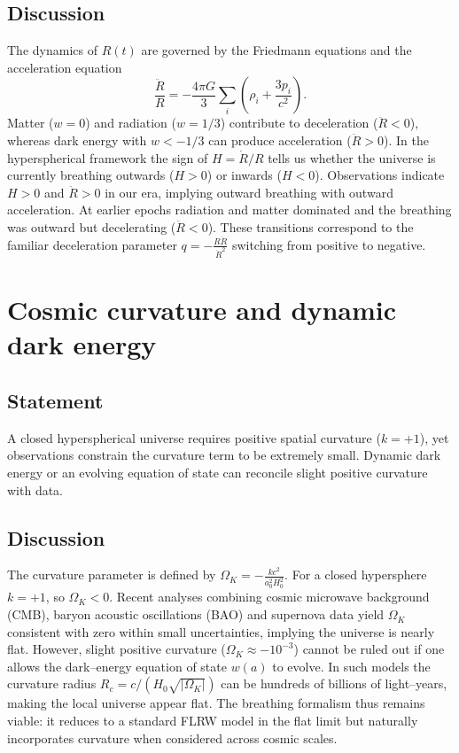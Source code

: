 \documentclass[12pt,a4paper]{article}
\begin{document}
\subsection{Discussion}
The dynamics of $R(t)$ are governed by the Friedmann equations and the acceleration equation
\[
\frac{\ddot{R}}{R} = -\frac{4\pi G}{3}\sum_i \left( \rho_i + \frac{3p_i}{c^2} \right).
\]
Matter ($w=0$) and radiation ($w=1/3$) contribute to deceleration ($\ddot{R}<0$), whereas dark energy with $w<-1/3$ can produce acceleration ($\ddot{R}>0$).  In the hyperspherical framework the sign of $H=\dot{R}/R$ tells us whether the universe is currently breathing outwards ($H>0$) or inwards ($H<0$).  Observations indicate $H>0$ and $\ddot{R}>0$ in our era, implying outward breathing with outward acceleration.  At earlier epochs radiation and matter dominated and the breathing was outward but decelerating ($\ddot{R}<0$).  These transitions correspond to the familiar deceleration parameter $q = -\frac{R \ddot{R}}{\dot{R}^2}$ switching from positive to negative.

\section{Cosmic curvature and dynamic dark energy}
\label{sec:curvature}
\subsection{Statement}
A closed hyperspherical universe requires positive spatial curvature ($k=+1$), yet observations constrain the curvature term to be extremely small.  Dynamic dark energy or an evolving equation of state can reconcile slight positive curvature with data.

\subsection{Discussion}
The curvature parameter is defined by $\Omega_K = -\frac{k c^2}{a_0^2 H_0^2}$.  For a closed hypersphere $k=+1$, so $\Omega_K < 0$.  Recent analyses combining cosmic microwave background (CMB), baryon acoustic oscillations (BAO) and supernova data yield $\Omega_K$ consistent with zero within small uncertainties, implying the universe is nearly flat.  However, slight positive curvature ($\Omega_K\approx -10^{-3}$) cannot be ruled out if one allows the dark–energy equation of state $w(a)$ to evolve.  In such models the curvature radius $R_c = c/(H_0\sqrt{|\Omega_K|})$ can be hundreds of billions of light–years, making the local universe appear flat.  The breathing formalism thus remains viable: it reduces to a standard FLRW model in the flat limit but naturally incorporates curvature when considered across cosmic scales.
\end{document}
